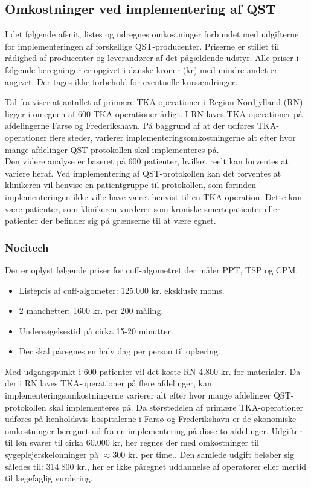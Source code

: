 \subsection{Omkostninger ved implementering af QST}
I det følgende afsnit, listes og udregnes omkostninger forbundet med udgifterne for implementeringen af forskellige QST-producenter. Priserne er stillet til rådighed af producenter og leverandører af det pågældende udstyr. Alle priser i følgende beregninger er opgivet i danske kroner (kr) med mindre andet er angivet. Der tages ikke forbehold for eventuelle kursændringer. 

Tal fra  viser at antallet af primære TKA-operationer i Region Nordjylland (RN) ligger i omegnen af 600 TKA-operationer årligt. \citep{aarsrapport2016} I RN laves TKA-operationer på afdelingerne Farsø og Frederikshavn. På baggrund af at der udføres TKA-operationer flere steder, varierer implementeringsomkostningerne alt efter hvor mange afdelinger QST-protokollen skal implementeres på. \\
Den videre analyse er baseret på 600 patienter, hvilket reelt kan forventes at variere heraf. Ved implementering af QST-protokollen kan det forventes at klinikeren vil henvise en patientgruppe til protokollen, som forinden implementeringen ikke ville have været henvist til en TKA-operation. Dette kan være patienter, som klinikeren vurderer som kroniske smertepatienter eller patienter der befinder sig på grænserne til at være egnet. 

\subsubsection{Nocitech}
Der er oplyst følgende priser for cuff-algometret der måler PPT, TSP og CPM.
\begin{itemize}  
\item Listepris af cuff-algometer: 125.000 kr. eksklusiv moms.
\item 2 manchetter: 1600 kr. per 200 måling.
\item Undersøgelsestid på cirka 15-20 minutter.
\item Der skal påregnes en halv dag per person til oplæring.
\end{itemize}

Med udgangspunkt i 600 patienter vil det koste RN 4.800 kr. for materialer. Da der i RN laves TKA-operationer på flere afdelinger, kan implementeringsomkostningerne varierer alt efter hvor mange afdelinger QST-protokollen skal implementeres på. Da størstedelen af primære TKA-operationer udføres på henholdsvis hospitalerne i Farsø og Frederikshavn er de økonomiske omkostninger beregnet ud fra en implementering på disse to afdelinger. Udgifter til løn svarer til cirka 60.000 kr, her regnes der med omkostninger til sygeplejerskelønninger på $\approx 300$ kr. per time.\citep{DST1}\citep{DTS2}. Den samlede udgift beløber sig således til: 314.800 kr., her er ikke påregnet uddannelse af operatører eller mertid til lægefaglig vurdering.

